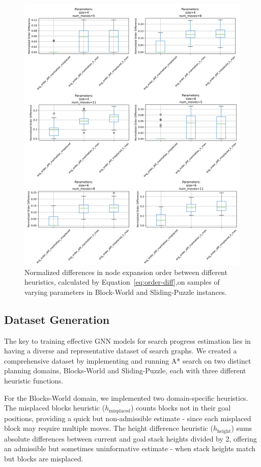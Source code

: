 \documentclass[letterpaper]{article}
\begin{document}
\begin{figure}[ht]
\begin{minipage}{0.39\textwidth}
        \includegraphics[width=\textwidth]{plots/sliding_puzzle_order_differences_2.png}
    \end{minipage}
    \caption{Normalized differences in node expansion order between different heuristics, calculated by Equation~\ref{eq:order-diff},on samples of varying parameters in Block-World and Sliding-Puzzle instances.}
    \label{fig:heuristic-order}
\end{figure}

\subsection{Dataset Generation}

The key to training effective GNN models for search progress estimation lies in having a diverse and representative dataset of search graphs. We created a comprehensive dataset by implementing and running A* search on two distinct planning domains, Blocks-World and Sliding-Puzzle, each with three different heuristic functions.

For the Blocks-World domain, we implemented two domain-specific heuristics. The misplaced blocks heuristic ($h_{\text{misplaced}}$) counts blocks not in their goal positions, providing a quick but non-admissible estimate - since each misplaced block may require multiple moves. The height difference heuristic ($h_{\text{height}}$) sums absolute differences between current and goal stack heights divided by 2, offering an admissible but sometimes uninformative estimate - when stack heights match but blocks are misplaced.
\end{document}
